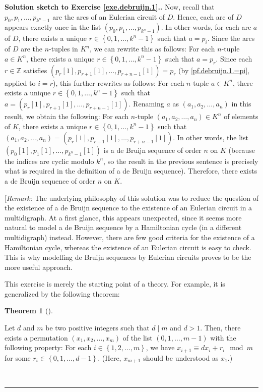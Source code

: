 \documentclass[numbers=enddot,12pt,final,onecolumn,notitlepage]{scrartcl}%
\newcounter{exer}
\theoremstyle{definition}
\newtheorem{theo}{Theorem}[section]
\newenvironment{theorem}[1][]
{\begin{theo}[#1]\begin{leftbar}}
{\end{leftbar}\end{theo}}
\newenvironment{proof}[1][Proof]{\noindent\textbf{#1.} }{\ \rule{0.5em}{0.5em}}
\newcommand{\ZZ}{\mathbb{Z}}
\newcommand{\set}[1]{\left\{ #1 \right\}}
\newcommand{\tup}[1]{\left( #1 \right)}
\newcommand{\ive}[1]{\left[ #1 \right]}
\begin{document}
\begin{proof}[Solution sketch to Exercise \ref{exe.debruijn.1}.]
Now, recall that $p_0, p_1, \ldots, p_{k^n-1}$ are the arcs
of an Eulerian circuit of $D$. Hence, each arc of $D$ appears
exactly once in the list $\tup{p_0, p_1, \ldots, p_{k^n-1}}$.
In other words, for each arc $a$ of $D$, there exists a unique
$r \in \set{0, 1, \ldots, k^n-1}$ such that $a = p_i$.
Since the arcs of $D$ are the $n$-tuples in $K^n$, we can
rewrite this as follows: For each $n$-tuple $a \in K^n$,
there exists a unique
$r \in \set{0, 1, \ldots, k^n-1}$ such that $a = p_r$. Since
each $r \in \ZZ$ satisfies
$\tup{p_r\ive{1}, p_{r+1}\ive{1}, \ldots, p_{r+n-1}\ive{1}}
= p_r$ (by \eqref{pf.debruijn.1.=pi}, applied to $i=r$),
this further rewrites as follows:
For each $n$-tuple $a \in K^n$,
there exists a unique $r \in \set{0, 1, \ldots, k^n-1}$
such that
$a = \tup{p_r\ive{1}, p_{r+1}\ive{1}, \ldots, p_{r+n-1}\ive{1}}$.
Renaming $a$ as $\tup{a_1, a_2, \ldots, a_n}$ in this result,
we obtain the following:
For each
$n$-tuple $\tup{a_1, a_2, \ldots, a_n} \in K^n$ of elements of $K$,
there exists a unique $r \in \set{0, 1, \ldots, k^n-1}$ such
that
$\tup{a_1, a_2, \ldots, a_n}
= \tup{p_r\ive{1}, p_{r+1}\ive{1}, \ldots, p_{r+n-1}\ive{1}}$.
In other words, the list
$\tup{p_0\ive{1}, p_1\ive{1}, \ldots, p_{k^n-1}\ive{1}}$ is a
de Bruijn sequence of order $n$ on $K$ (because the indices are
cyclic modulo $k^n$, so the result in the previous sentence is
precisely what is required in the definition of a de Bruijn
sequence). Therefore, there exists a de Bruijn sequence of order
$n$ on $K$.

[\textit{Remark:} The underlying philosophy of this solution was
to reduce the question of the existence of a de Bruijn sequence
to the existence of an Eulerian circuit in a multidigraph. At a
first glance, this appears unexpected, since it seems more natural
to model a de Bruijn sequence by a Hamiltonian cycle (in a different
multidigraph) instead. However, there are few good criteria for the
existence of a Hamiltonian cycle, whereas the existence of an
Eulerian circuit is easy to check. This is why modelling
de Bruijn sequences by Eulerian circuits proves to be the more
useful approach.

This exercise is merely the starting point of a theory. For example,
it is generalized by the following theorem:
\begin{theorem} \label{sol.debruijn.1.gen}
Let $d$ and $m$ be two positive integers such that $d \mid m$ and
$d > 1$. Then, there exists a permutation
$\tup{x_1, x_2, \ldots, x_m}$ of the list $\tup{0, 1, \ldots, m-1}$
with the following property:
For each $i \in \set{1, 2, \ldots, m}$, we have
$x_{i+1} \equiv d x_i + r_i \mod m$ for some
$r_i \in \set{0, 1, \ldots, d-1}$. (Here, $x_{m+1}$ should be
understood as $x_1$.)
\end{theorem}


\end{proof}
\end{document}
